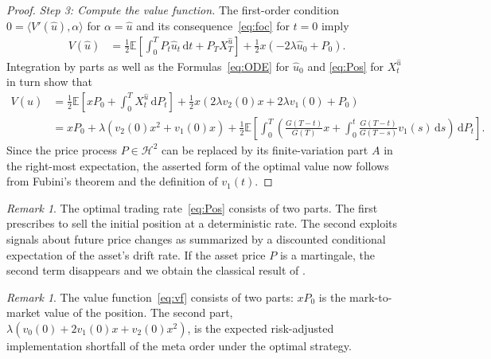 \documentclass[11pt]{article}
\numberwithin{equation}{section}
\theoremstyle{definition}
\theoremstyle{remark}
\newtheorem{rem}[thm]{Remark}
\newcommand{\E}{\mathbb{E}} %
\newcommand{\de}{\,\mathrm{d}}
\begin{document}
\begin{proof}
\emph{Step 3: Compute the value function.}
The first-order condition $0=\langle V'(\hat{u}), \alpha \rangle$ for $\alpha=\hat{u}$ and its consequence~\eqref{eq:foc} for $t=0$ imply
\begin{align*}
V(\hat{u}) &= \frac{1}{2}\E\left[\int_0^T P_t \hat{u}_t \de t + P_T X^{\hat{u}}_T \right] + \frac{1}{2}x(-2\lambda \hat{u}_0 + P_0).
\end{align*}
Integration by parts as well as the Formulas~\eqref{eq:ODE} for $\hat{u}_0$ and \eqref{eq:Pos} for $X^{\hat{u}}_t$ in turn show that
\begin{align*}
V(\hat{u}) &=\frac{1}{2}\E\left[xP_0 + \int_0^T X^{\hat{u}}_t \de P_t \right] + \frac{1}{2}x(2\lambda v_2(0)x + 2\lambda v_1(0) + P_0)\\
&= xP_0 + \lambda(v_2(0)x^2+v_1(0)x) + \frac{1}{2}\E\left[\int_0^T \left(\frac{G(T-t)}{G(T)}x + \int_0^t \frac{G(T-t)}{G(T-s)}v_1(s) \de s\right) \de P_t\right].
\end{align*}
Since the price process $P \in \mathcal{H}^2$ can be replaced by its finite-variation part $A$ in the right-most expectation, the asserted form of the optimal value now follows from Fubini's theorem and the definition of $v_1(t)$. 
\end{proof}


\begin{rem}
The optimal trading rate~\eqref{eq:Pos} consists of two parts. The first prescribes to sell the initial position at a deterministic rate. The second exploits signals about future price changes as summarized by a discounted conditional expectation of the asset's drift rate. If the asset price $P$ is a martingale, the second term disappears and we obtain the classical result of \cite{almgren2001optimal}. 
\end{rem}

\begin{rem}
The value function~\eqref{eq:vf} consists of two parts: $xP_0$ is the mark-to-market value of the position. The second part, $\lambda(v_0(0)+2v_1(0)x+v_2(0)x^2)$, is the expected risk-adjusted implementation shortfall of the meta order under the optimal strategy.
\end{rem}
\end{document}
